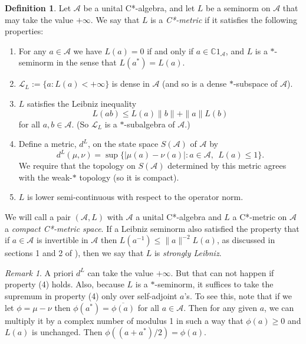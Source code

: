 \documentclass{amsart}[14pt]
\theoremstyle{definition}
\newtheorem{definition}[theorem]{Definition}
\theoremstyle{remark}
\newtheorem{remark}[theorem]{Remark}
\newcommand{\cA}{{\mathcal A}}
\newcommand{\cL}{{\mathcal L}}
\newcommand{\bC}{{\mathbb C}}
\newcommand{\<}{\langle}
\renewcommand{\>}{\rangle}
\numberwithin{equation}{section}
\begin{document}
{\begin{definition} 
\label{deflip}
Let $\cA $ be a unital C*-algebra, 
and let $ L $ be a seminorm on $\cA $ 
that may take the value $+\infty $. We say that
$ L$ is a \emph{C*-metric} if it satisfies the following properties: 
\begin{enumerate}
\item For any $a\in \cA $ we have 
$ L (a) = 0 $ if and only if $a \in \bC 1_\cA $, and
$L$ is a $*$-seminorm in the sense that
$ L (a^*) = L (a) $.
\item $\cL_L := \{a: L (a) < +\infty\}$ is dense in $\cA $ 
(and so is a dense $*$-subspace of $\cA$).
\item $L$ satisfies the Leibniz inequality
\begin{equation*}
\label{eqleib}
L(ab) \leq L(a)\|b\| + \|a\| L(b)  
\end{equation*}
for all $a,b \in \cA$. (So $\cL_L$ is a $*$-subalgebra of $\cA$.)
\item Define a metric, $d^L $, on the state space
$ S (\cA) $ of $\cA$ by
\begin{equation}
\label{distance}
d^L (\mu, \nu) =\sup \{|\mu (a) -\nu (a)|: a \in \cA, \ \ L (a)\leq 1 \}  .
\end{equation}
 We require that the topology 
on $ S (\cA) $ determined by this metric agrees with the 
weak-$*$ topology (so it is compact).
\item $L$ is lower semi-continuous with respect to the 
operator norm.
\end{enumerate}
We will call a pair $(\cA, L)$ with $\cA$ a unital C*-algebra
and $L$ a C*-metric on $\cA$ a \emph{compact C*-metric space}.
If a Leibniz seminorm also satisfied the property that if 
$a \in \cA$ is invertible in $\cA$
then $L(a^{-1}) \leq \|a\|^{-2}L(a)$, as discussed 
in sections 1 and 2 of \cite{R21}), then we say that $L$ is
\emph{strongly Leibniz}.
\end{definition}

\begin{remark}
\label{remar}
A priori $d^L$ can take the value $+\infty$. 
But that can not happen if property (4) holds.
Also, because $L$ is a $*$-seminorm, 
it suffices to take the supremum in property (4)
only over self-adjoint $a$'s. To see this, note that
if we let $\phi = \mu - \nu$ then $\phi(a^*) = \overline{\phi(a)}$ for
all $a \in \cA$. Then for any given $a$, we can multiply it
by a complex number of modulus 1 in such a way that
$\phi(a) \geq 0$ and $L(a)$ is unchanged. Then
$\phi((a  + a^*)/2) = \phi(a)$.  
\end{remark}

}
\end{document}

